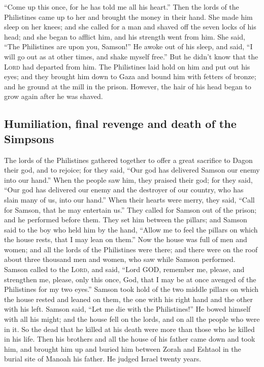 ``Come up this once, for he has told me all his heart.'' Then the lords
of the Philistines came up to her and brought the money in their hand.
 She made him sleep on her knees; and she called for a
man and shaved off the seven locks of his head; and she began to afflict
him, and his strength went from him.  She said, ``The
Philistines are upon you, Samson!'' He awoke out of his sleep, and said,
``I will go out as at other times, and shake myself free.'' But he
didn't know that the \textsc{Lord} had departed from him.
 The Philistines laid hold on him and put out his eyes;
and they brought him down to Gaza and bound him with fetters of bronze;
and he ground at the mill in the prison.  However, the
hair of his head began to grow again after he was shaved.

\hypertarget{humiliation-final-revenge-and-death-of-the-simpsons}{%
\subsection{Humiliation, final revenge and death of the
Simpsons}\label{humiliation-final-revenge-and-death-of-the-simpsons}}

 The lords of the Philistines gathered together to offer
a great sacrifice to Dagon their god, and to rejoice; for they said,
``Our god has delivered Samson our enemy into our hand.''
 When the people saw him, they praised their god; for
they said, ``Our god has delivered our enemy and the destroyer of our
country, who has slain many of us, into our hand.''  When
their hearts were merry, they said, ``Call for Samson, that he may
entertain us.'' They called for Samson out of the prison; and he
performed before them. They set him between the pillars; 
and Samson said to the boy who held him by the hand, ``Allow me to feel
the pillars on which the house rests, that I may lean on them.''
 Now the house was full of men and women; and all the
lords of the Philistines were there; and there were on the roof about
three thousand men and women, who saw while Samson performed.
 Samson called to the \textsc{Lord}, and said, ``Lord
GOD, remember me, please, and strengthen me, please, only this once,
God, that I may be at once avenged of the Philistines for my two eyes.''
 Samson took hold of the two middle pillars on which the
house rested and leaned on them, the one with his right hand and the
other with his left.  Samson said, ``Let me die with the
Philistines!'' He bowed himself with all his might; and the house fell
on the lords, and on all the people who were in it. So the dead that he
killed at his death were more than those who he killed in his life.
 Then his brothers and all the house of his father came
down and took him, and brought him up and buried him between Zorah and
Eshtaol in the burial site of Manoah his father. He judged Israel twenty
years.

